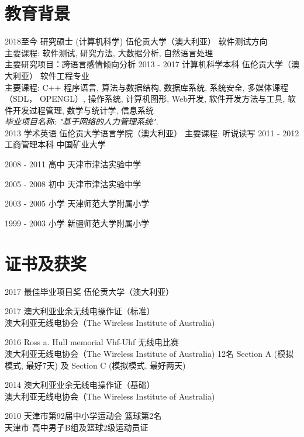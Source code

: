 \documentclass[]{friggeri-cv}
\begin{document}
\section{教育背景}
\begin{entrylist}
  \entry
    {2018至今}
    {研究硕士 (计算机科学)}
    {伍伦贡大学（澳大利亚）}
    {软件测试方向\\
    主要课程: 软件测试, 研究方法, 大数据分析, 自然语言处理\\
    主要研究项目：跨语言感情倾向分析}
  \entry
    {2013 - 2017}
    {计算机科学本科​}
    {伍伦贡大学（澳大利亚）}
    {软件工程专业\\
    主要课程: C++ 程序语言, 算法与数据结构, 数据库系统, 系统安全, 多媒体课程（SDL， OPENGL）, 操作系统, 计算机图形, Web开发, 软件开发方法与工具, 软件开发过程管理, 数学与统计学, 信息系统\\
    \emph{毕业项目名称: "基于网络的人力管理系统".}\\}
  \entry
    {2013}
    {学术英语}
    {伍伦贡大学语言学院（澳大利亚）}
    {主要课程: 听说读写}
  \entry
    {2011 - 2012}
    {工商管理本科}
    {中国矿业大学}
    
  \entry
    {2008 - 2011}
    {高中}
    {天津市津沽实验中学}
    {}
    
  \entry
    {2005 - 2008}
    {初中}
    {天津市津沽实验中学}
    
  \entry
    {2003 - 2005}
    {小学}
    {天津师范大学附属小学} 
    
  \entry
    {1999 - 2003}
    {小学}
    {新疆师范大学附属小学}  
    
\end{entrylist}
\newpage
\section{证书及获奖}
\begin{entrylist}
  \entry
    {2017}
    {最佳毕业项目奖}
    {伍伦贡大学（澳大利亚）}

  \entry
    {2017}
    {澳大利亚业余无线电操作证（标准）\\}
    {澳大利亚无线电协会（The Wireless Institute of Australia)}

  \entry
    {2016}
    {Ross a. Hull memorial Vhf-Uhf 无线电比赛\\}
    {澳大利亚无线电协会（The Wireless Institute of Australia)}
    {12名 Section A (模拟模式, 最好7天) 及 Section C (模拟模式, 最好两天)}

  \entry
    {2014}
    {澳大利亚业余无线电操作证（基础）\\}
    {澳大利亚无线电协会（The Wireless Institute of Australia)}
   
  \entry
    {2010}
    {天津市第92届中小学运动会 篮球第2名\\}
    {天津市}
    {高中男子B组及篮球2级运动员证}

\end{entrylist}
\end{document}

